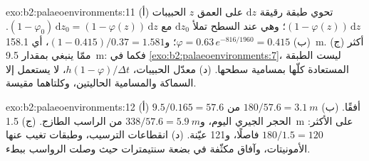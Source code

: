 \begin{solution}{exo:b2:palaeoenvironments:11}
(أ) تحوي طبقة رقيقة $\mathrm dz$ على العمق $z$ الحبيبات $(1 - \varphi(z))\,\mathrm dz$؛
وهي عند السطح تملأ $\mathrm dz_0$ مع $(1 - \varphi_0)\,\mathrm dz_0 = (1 -
\varphi(z))\,\mathrm dz$. (ب) $\varphi = 0.63\,e^{-816/1960} = 0.415$؛ و$(1 - 0.415)/0.37 =
1.581$، أي \qty{158.1}{m}. (ج) أكثر ممّا ينبغي بمقدار \qty{9.5}{m}: فكما في \cref{exo:b2:palaeoenvironments:7}،
ليست الطبقة المستعادة كلّها بمسامية سطحها. (د) معدّل الحبيبات،
$h(1-\varphi)/\Delta t$، لا يستعمل إلا السماكة والمسامية الحاليتين، وكلتاهما مقيسة.
\end{solution}

\begin{solution}{exo:b2:palaeoenvironments:12}
(أ) $9.5/0.165 = 57.6$ أفقًا. (ب) $180/57.6 = \qty{3.1}{m}$ من الحجر الجيري اليوم، و$338/57.6 =
\qty{5.9}{m}$ من الراسب الطازج. (ج) \qty{1.5}{m} على الأكثر: $180/1.5 = 120$ فاصلًا، و121
عيّنة. (د) انقطاعات الترسيب، وطبقات تغيب عنها الأمونيتات، وآفاق مكثّفة في
بضعة سنتيمترات حيث وصلت الرواسب ببطء.
\end{solution}

